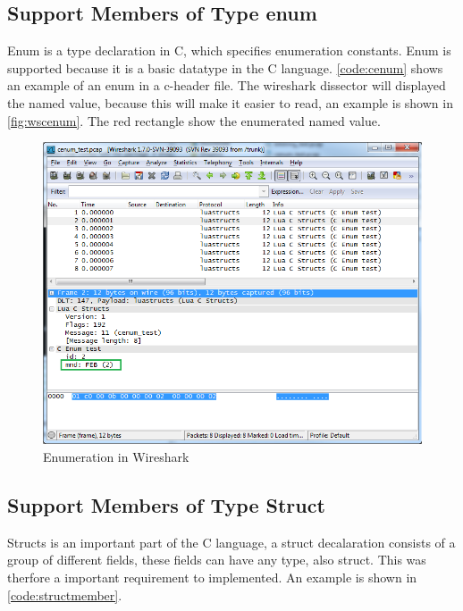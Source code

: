 \subsection{Support Members of Type enum}
\label{sec:support_enum}
Enum is a type declaration in C, which specifies enumeration constants.  Enum 
is supported because it is a basic datatype in the C language. 
\autoref{code:cenum} shows an example of an enum in a c-header file. The 
wireshark dissector will displayed the named value, because this will make it 
easier to read, an example is shown in \autoref{fig:wscenum}. The red 
rectangle show the enumerated named value.

\begin{figure}[ht]
	\center
	\includegraphics[width=\textwidth]{./sprints/img/wireshark_cenum}
	\caption{Enumeration in Wireshark\label{fig:wscenum}}
\end{figure}



\subsection{Support Members of Type Struct}
Structs is an important part of the C language, a struct decalaration consists 
of a group of different fields, these fields can have any type, also struct. 
This was therfore a important requirement to implemented. An example is shown 
in \autoref{code:structmember}.

